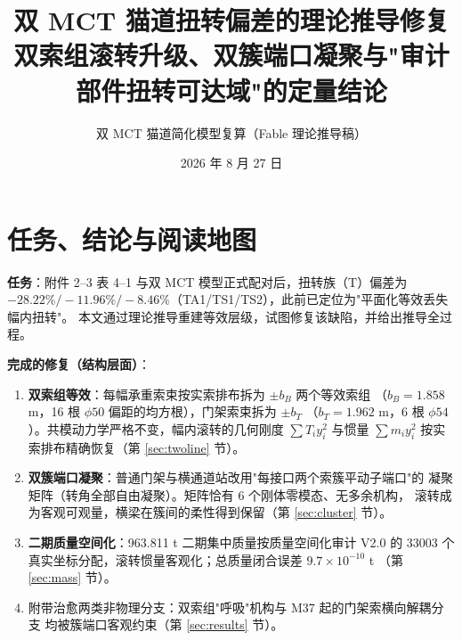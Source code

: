 \documentclass[11pt,a4paper]{ctexart}
\title{\bfseries 双 MCT 猫道扭转偏差的理论推导修复\\
\large 双索组滚转升级、双簇端口凝聚与"审计部件扭转可达域"的定量结论}
\author{双 MCT 猫道简化模型复算（Fable 理论推导稿）}
\date{2026 年 8 月 27 日}
\begin{document}
\maketitle

\noindent{}

\section{任务、结论与阅读地图}

\textbf{任务}：附件 2--3 表 4--1 与双 MCT 模型正式配对后，扭转族（T）偏差为
$-28.22\%/-11.96\%/-8.46\%$（TA1/TS1/TS2），此前已定位为"平面化等效丢失幅内扭转"。
本文通过理论推导重建等效层级，试图修复该缺陷，并给出推导全过程。

\textbf{完成的修复（结构层面）}：
\begin{enumerate}
  \item \textbf{双索组等效}：每幅承重索束按实索排布拆为 $\pm b_B$ 两个等效索组
        （$b_B=1.858$ m，16 根 $\phi50$ 偏距的均方根），门架索束拆为 $\pm b_T$
        （$b_T=1.962$ m，6 根 $\phi54$）。共模动力学严格不变，幅内滚转的几何刚度
        $\sum T_i y_i^2$ 与惯量 $\sum m_i y_i^2$ 按实索排布精确恢复（第 \ref{sec:twoline} 节）。
  \item \textbf{双簇端口凝聚}：普通门架与横通道站改用"每接口两个索簇平动子端口"的
        凝聚矩阵（转角全部自由凝聚）。矩阵恰有 6 个刚体零模态、无多余机构，
        滚转成为客观可观量，横梁在簇间的柔性得到保留（第 \ref{sec:cluster} 节）。
  \item \textbf{二期质量空间化}：963.811 t 二期集中质量按质量空间化审计 V2.0 的
        33003 个真实坐标分配，滚转惯量客观化；总质量闭合误差 $9.7\times10^{-10}$ t
        （第 \ref{sec:mass} 节）。
  \item 附带治愈两类非物理分支：双索组"呼吸"机构与 M37 起的门架索横向解耦分支
        均被簇端口客观约束（第 \ref{sec:results} 节）。
\end{enumerate}
\end{document}
